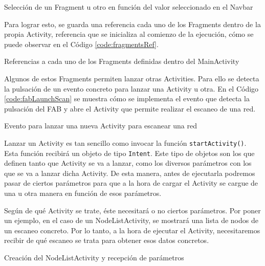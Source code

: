 \begin{code}
	\caption{Selección de un Fragment u otro en función del valor seleccionado en el Navbar}
	\label{code:navSelection}
	
\end{code}

Para lograr esto, se guarda una referencia cada uno de los Fragments dentro de la propia Activity, referencia que se inicializa al comienzo de la ejecución, cómo se puede observar en el Código \ref{code:fragmentsRef}.

\begin{code}
	\caption{Referencias a cada uno de los Fragments definidas dentro del MainActivity}
	\label{code:fragmentsRef}
	
\end{code}

Algunos de estos Fragments permiten lanzar otras Activities. Para ello se detecta la pulsación de un evento concreto para lanzar una Activity u otra. En el Código \ref{code:fabLaunchScan} se muestra cómo se implementa el evento que detecta la pulsación del FAB y abre el Activity  que permite realizar el escaneo de una red.

\begin{code}
	\caption{Evento para lanzar una nueva Activity para escanear una red}
	\label{code:fabLaunchScan}
	
\end{code}

Lanzar un Activity es tan sencillo como invocar la función \texttt{startActivity()}. Esta función recibirá un objeto de tipo \texttt{Intent}. Este tipo de objetos son los que definen tanto que Activity se va a lanzar, como los diversos parámetros con los que se va a lanzar dicha Activity. De esta manera, antes de ejecutarla podremos pasar de ciertos parámetros para que a la hora de cargar el Activity se cargue de una u otra manera en función de esos parámetros.

Según de qué Activity se trate, éste necesitará o no ciertos parámetros. Por poner un ejemplo, en el caso de un NodeListActivity, se mostrará una lista de nodos de un escaneo concreto. Por lo tanto, a la hora de ejecutar el Activity, necesitaremos recibir de qué escaneo se trata para obtener esos datos concretos.

\begin{code}
	\caption{Creación del NodeListActivity y recepción de parámetros}
	\label{code:nodeListActivityOnCreate}
	
\end{code}

